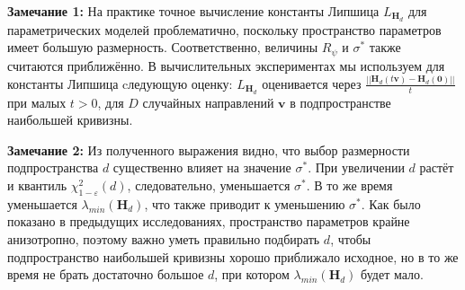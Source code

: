 \documentclass[11pt,a4paper]{article}
\begin{document}
\textbf{Замечание 1:} На практике точное вычисление константы Липшица $L_{\mathbf{H}_d}$ для параметрических моделей проблематично, поскольку пространство параметров имеет большую размерность. Соответственно, величины $R_{\psi}$ и $\sigma^{*}$ также считаются приближённо. \newline
В вычислительных экспериментах мы используем для константы Липшица cледующую оценку: 
$L_{\mathbf{H}_d}$ оценивается через $\frac{||\mathbf{H}_d(t\mathbf{v}) - \mathbf{H}_d(\mathbf{0})||}{t}$ при малых $t > 0$, для $D$ случайных направлений $\mathbf{v}$ в подпространстве наибольшей кривизны.


\textbf{Замечание 2:}
Из полученного выражения видно, что выбор размерности подпространства $d$ существенно влияет на значение $\sigma^{*}$. При увеличении $d$ растёт и квантиль $\chi^2_{1-\varepsilon}(d)$, следовательно, уменьшается $\sigma^{*}$. В то же время уменьшается $\lambda_{min}(\mathbf{H}_d)$, что также приводит к уменьшению $\sigma^{*}$. Как было показано в предыдущих исследованиях, пространство параметров крайне анизотропно, поэтому важно уметь правильно подбирать $d$, чтобы подпространство наибольшей кривизны хорошо приближало исходное, но в то же время не брать достаточно большое $d$, при котором $\lambda_{min}(\mathbf{H}_d)$ будет мало.
\end{document}

